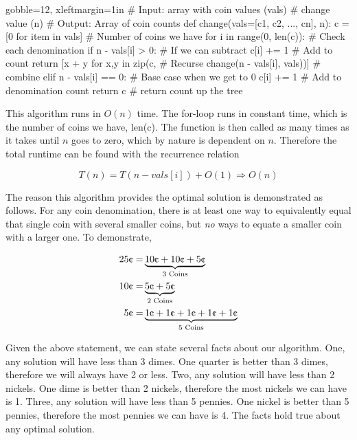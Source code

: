 \documentclass[10pt]{article}
\begin{document}
\begin{easylist}[enumerate]
        \begin{pythoncode*}{gobble=12, xleftmargin=1in}
            # Input: array with coin values (vals)
            #        change value (n)
            # Output: Array of coin counts
            def change(vals=[c1, c2, ..., cn], n):
                c = [0 for item in vals]   # Number of coins we have
                for i in range(0, len(c)): # Check each denomination
                    if n - vals[i] > 0: # If we can subtract
                        c[i] += 1  # Add to count
                        return [x + y for x,y in zip(c, # Recurse
                                change(n - vals[i], vals))] # combine
                    elif n - vals[i] == 0: # Base case when we get to 0
                        c[i] += 1 # Add to denomination count
                        return c # return count up the tree
        \end{pythoncode*}

        This algorithm runs in $O(n)$ time. The {\ttfamily for}-loop runs in constant time, which is the number of coins
        we have, {\ttfamily len(c)}. The function is then called as many times as it takes until $n$ goes to zero, which
        by nature is dependent on $n$. Therefore the total runtime can be found with the recurrence relation

        \[ T(n) = T(n - vals[i]) + O(1) \Rightarrow O(n) \]

        The reason this algorithm provides the optimal solution is demonstrated as follows. For any coin denomination,
        there is at least one way to equivalently equal that single coin with several smaller coins, but \textit{no}
        ways to equate a smaller coin with a larger one. To demonstrate,

            \[ \begin{aligned}
                25 \cents =& \underbrace{10 \cents + 10 \cents + 5 \cents}_{\text{3 Coins} }\\
                10 \cents =& \underbrace{5 \cents + 5 \cents}_{\text{2 Coins} }\\
                5 \cents  =& \underbrace{1 \cents + 1 \cents + 1 \cents + 1 \cents + 1 \cents}_{\text{5 Coins} }\\
            \end{aligned} \]

        Given the above statement, we can state several facts about our algorithm. One, any solution will have less than
        3 dimes. One quarter is better than 3 dimes, therefore we will always have 2 or less. Two, any solution will
        have less than 2 nickels. One dime is better than 2 nickels, therefore the most nickels we can have is 1. Three,
        any solution will have less than 5 pennies. One nickel is better than 5 pennies, therefore the most pennies we
        can have is 4. The facts hold true about any optimal solution.


\end{easylist}
\end{document}
